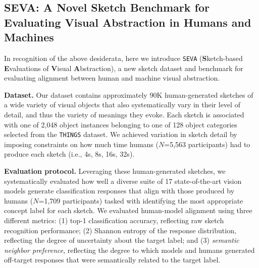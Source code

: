\documentclass{article}
\begin{document}
\subsection{SEVA: A Novel Sketch Benchmark for Evaluating Visual Abstraction in Humans and Machines}

In recognition of the above desiderata, here we introduce \texttt{SEVA} (\textbf{S}ketch-based \textbf{E}valuations of \textbf{V}isual \textbf{A}bstraction), a new sketch dataset and benchmark for evaluating alignment between human and machine visual abstraction. 

\textbf{Dataset.} Our dataset contains approximately 90K human-generated sketches of a wide variety of visual objects that also systematically vary in their level of detail, and thus the variety of meanings they evoke. 
Each sketch is associated with one of 2,048 object instances belonging to one of 128 object categories selected from the \texttt{THINGS} dataset\cite{hebart2019things}. 
We achieved variation in sketch detail by imposing constraints on how much time humans ($N$=5,563 participants) had to produce each sketch (i.e., 4s, 8s, 16s, 32s). 

\textbf{Evaluation protocol.} Leveraging these human-generated sketches, we systematically evaluated how well a diverse suite of 17 state-of-the-art vision models generate classification responses that align with those produced by humans ($N$=1,709 participants) tasked with identifying the most appropriate concept label for each sketch. 
We evaluated human-model alignment using three different metrics: (1) top-1 classification accuracy, reflecting raw sketch recognition performance; (2) Shannon entropy of the response distribution, reflecting the degree of uncertainty about the target label; and (3) \textit{semantic neighbor preference}, reflecting the degree to which models and humans generated off-target responses that were semantically related to the target label. 
\end{document}
